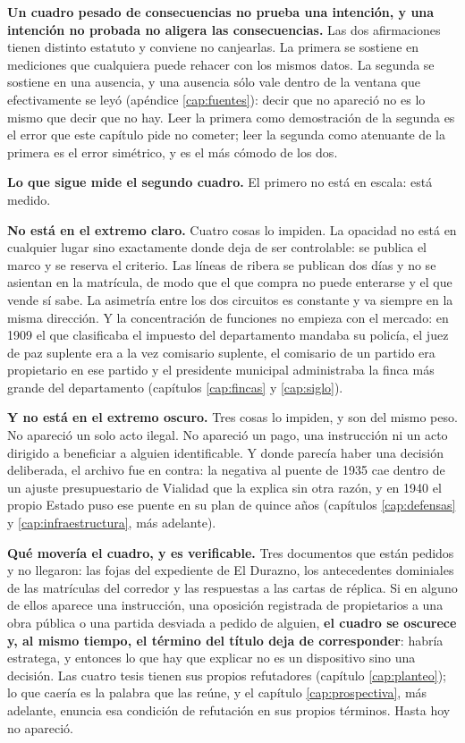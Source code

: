 \textbf{Un cuadro pesado de consecuencias no prueba una intención, y una intención no probada
no aligera las consecuencias.} Las dos afirmaciones tienen distinto estatuto y conviene no
canjearlas. La primera se sostiene en mediciones que cualquiera puede rehacer con los mismos
datos. La segunda se sostiene en una ausencia, y una ausencia sólo vale dentro de la ventana
que efectivamente se leyó (apéndice \ref{cap:fuentes}): decir que no apareció no es lo mismo
que decir que no hay. Leer la primera como demostración de la segunda es el error que este
capítulo pide no cometer; leer la segunda como atenuante de la primera es el error simétrico, y
es el más cómodo de los dos.

\textbf{Lo que sigue mide el segundo cuadro.} El primero no está en escala: está medido.

\textbf{No está en el extremo claro.} Cuatro cosas lo impiden. La opacidad no está en cualquier
lugar sino exactamente donde deja de ser controlable: se publica el marco y se reserva el
criterio. Las líneas de ribera se publican dos días y no se asientan en la matrícula, de modo
que el que compra no puede enterarse y el que vende sí sabe. La asimetría entre los dos
circuitos es constante y va siempre en la misma dirección. Y la concentración de funciones no
empieza con el mercado: en 1909 el que clasificaba el impuesto del departamento mandaba su
policía, el juez de paz suplente era a la vez comisario suplente, el comisario de un partido era
propietario en ese partido y el presidente municipal administraba la finca más grande del
departamento (capítulos \ref{cap:fincas} y \ref{cap:siglo}).

\textbf{Y no está en el extremo oscuro.} Tres cosas lo impiden, y son del mismo peso. No
apareció un solo acto ilegal. No apareció un pago, una instrucción ni un acto dirigido a
beneficiar a alguien identificable. Y donde parecía haber una decisión deliberada, el archivo
fue en contra: la negativa al puente de 1935 cae dentro de un ajuste presupuestario de Vialidad
que la explica sin otra razón, y en 1940 el propio Estado puso ese puente en su plan de quince
años (capítulos \ref{cap:defensas} y \ref{cap:infraestructura}, más adelante).

\textbf{Qué movería el cuadro, y es verificable.} Tres documentos que están pedidos y no
llegaron: las fojas del expediente de El Durazno, los antecedentes dominiales de las matrículas
del corredor y las respuestas a las cartas de réplica. Si en alguno de ellos aparece una
instrucción, una oposición registrada de propietarios a una obra pública o una partida desviada
a pedido de alguien, \textbf{el cuadro se oscurece y, al mismo tiempo, el término del título deja de
corresponder}: habría estratega, y entonces lo que hay que explicar no es un dispositivo sino
una decisión. Las cuatro tesis tienen sus propios refutadores (capítulo \ref{cap:planteo}); lo que caería es la palabra que las reúne, y el capítulo \ref{cap:prospectiva}, más adelante, enuncia esa condición de refutación en sus
propios términos. Hasta hoy no apareció.

